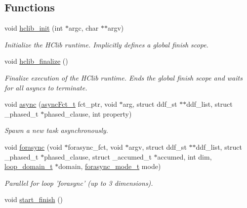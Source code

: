 \subsection*{Functions}
\begin{DoxyCompactItemize}
\item 
\hypertarget{group__HClib_ga613f855069ec1a9a183f44301e213b8b}{void \hyperlink{group__HClib_ga613f855069ec1a9a183f44301e213b8b}{hclib\-\_\-init} (int $\ast$argc, char $\ast$$\ast$argv)}\label{group__HClib_ga613f855069ec1a9a183f44301e213b8b}

\begin{DoxyCompactList}\small\item\em Initialize the H\-Clib runtime. Implicitly defines a global finish scope. \end{DoxyCompactList}\item 
\hypertarget{group__HClib_gab70c52aa978066d86d88b006f8875528}{void \hyperlink{group__HClib_gab70c52aa978066d86d88b006f8875528}{hclib\-\_\-finalize} ()}\label{group__HClib_gab70c52aa978066d86d88b006f8875528}

\begin{DoxyCompactList}\small\item\em Finalize execution of the H\-Clib runtime. Ends the global finish scope and waits for all asyncs to terminate. \end{DoxyCompactList}\item 
void \hyperlink{group__HClib_ga6d98dad2020df9d38726a80255369232}{async} (\hyperlink{group__HClib_ga20743540e3494c2c031dffd26bf92915}{async\-Fct\-\_\-t} fct\-\_\-ptr, void $\ast$arg, struct ddf\-\_\-st $\ast$$\ast$ddf\-\_\-list, struct \-\_\-phased\-\_\-t $\ast$phased\-\_\-clause, int property)
\begin{DoxyCompactList}\small\item\em Spawn a new task asynchronously. \end{DoxyCompactList}\item 
void \hyperlink{group__HClib_ga3a0951c09f376bc75ab512828eb208ee}{forasync} (void $\ast$forasync\-\_\-fct, void $\ast$argv, struct ddf\-\_\-st $\ast$$\ast$ddf\-\_\-list, struct \-\_\-phased\-\_\-t $\ast$phased\-\_\-clause, struct \-\_\-accumed\-\_\-t $\ast$accumed, int dim, \hyperlink{structloop__domain__t}{loop\-\_\-domain\-\_\-t} $\ast$domain, \hyperlink{group__HClib_gac5a6aae98ea2921fc0f474327e3b3b27}{forasync\-\_\-mode\-\_\-t} mode)
\begin{DoxyCompactList}\small\item\em Parallel for loop 'forasync' (up to 3 dimensions). \end{DoxyCompactList}\item 
\hypertarget{group__HClib_ga3792b13d399b1e03dc86a4339b0c6c10}{void \hyperlink{group__HClib_ga3792b13d399b1e03dc86a4339b0c6c10}{start\-\_\-finish} ()}\label{group__HClib_ga3792b13d399b1e03dc86a4339b0c6c10}


\end{DoxyCompactItemize}

